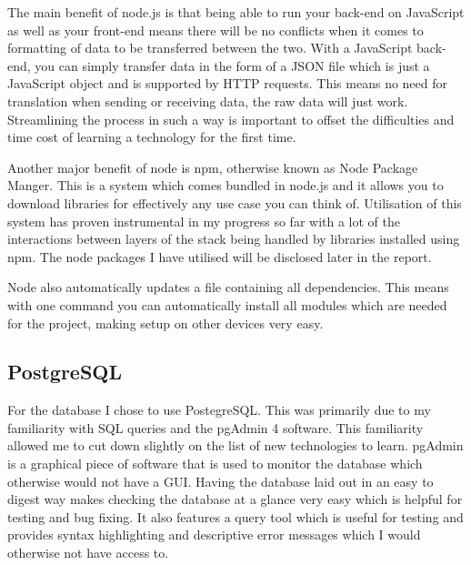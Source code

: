 \documentclass[]{final_report}
\begin{document}
The main benefit of node.js is that being able to run your back-end on JavaScript as well as your front-end means there will be no conflicts when it comes to formatting of data to be transferred between the two. With a JavaScript back-end, you can simply transfer data in the form of a JSON file which is just a JavaScript object and is supported by HTTP requests. This means no need for translation when sending or receiving data, the raw data will just work. Streamlining the process in such a way is important to offset the difficulties and time cost of learning a technology for the first time.

Another major benefit of node is npm, otherwise known as Node Package Manger. This is a system which comes bundled in node.js and it allows you to download libraries for effectively any use case you can think of. Utilisation of this system has proven instrumental in my progress so far with a lot of the interactions between layers of the stack being handled by libraries installed using npm. The node packages I have utilised will be disclosed later in the report.

Node also automatically updates a file containing all dependencies. This means with one command you can automatically install all modules which are needed for the project, making setup on other devices very easy.

\subsection{PostgreSQL}
For the database I chose to use PostegreSQL. This was primarily due to my familiarity with SQL queries and the pgAdmin 4 software. This familiarity allowed me to cut down slightly on the list of new technologies to learn. pgAdmin is a graphical piece of software that is used to monitor the database which otherwise would not have a GUI. Having the database laid out in an easy to digest way makes checking the database at a glance very easy which is helpful for testing and bug fixing. It also features a query tool which is useful for testing and provides syntax highlighting and descriptive error messages which I would otherwise not have access to.

\newpage
\end{document}
